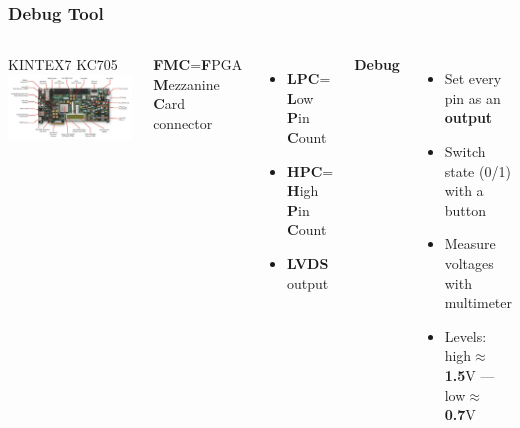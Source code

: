 \documentclass[aspectratio=169]{beamer}
\begin{document}
	\begin{frame}
		\frametitle{Debug Tool}
		\begin{columns}
			\begin{center}
				{\color{blue} KINTEX7 KC705}
				\includegraphics[width=1.0 \textwidth]{IMG/KC705.PNG}
			\end{center}
			\textbf{FMC}{\tiny =\textbf{F}PGA \textbf{M}ezzanine \textbf{C}ard} connector
			\begin{itemize}
				\item \textbf{LPC}= \textbf{L}ow \textbf{P}in \textbf{C}ount
				\item \textbf{HPC}= \textbf{H}igh \textbf{P}in \textbf{C}ount
				\item \textbf{LVDS} output 
			\end{itemize}
			\textbf{Debug}
			\begin{itemize}
				\item Set every pin as an \textbf{output}
				\item Switch state (0/1) with a button
				\item Measure voltages with multimeter
				\item Levels: high$\approx$\textbf{1.5}V --- low$\approx$\textbf{0.7}V
			\end{itemize}
		\end{columns}
	\end{frame}
\end{document}
